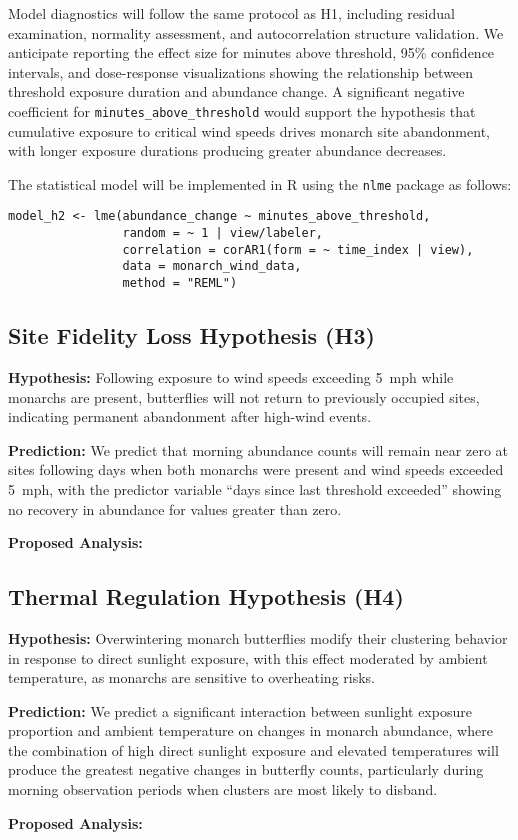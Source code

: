 Model diagnostics will follow the same protocol as H1, including residual examination, normality assessment, and autocorrelation structure validation. We anticipate reporting the effect size for minutes above threshold, 95\% confidence intervals, and dose-response visualizations showing the relationship between threshold exposure duration and abundance change. A significant negative coefficient for \texttt{minutes\_above\_threshold} would support the hypothesis that cumulative exposure to critical wind speeds drives monarch site abandonment, with longer exposure durations producing greater abundance decreases.

The statistical model will be implemented in R using the \texttt{nlme} package as follows:

\begin{verbatim}
model_h2 <- lme(abundance_change ~ minutes_above_threshold,
                random = ~ 1 | view/labeler,
                correlation = corAR1(form = ~ time_index | view),
                data = monarch_wind_data,
                method = "REML")
\end{verbatim}

\subsection{Site Fidelity Loss Hypothesis (H3)}

\textbf{Hypothesis:} Following exposure to wind speeds exceeding 5~mph while monarchs are present, butterflies will not return to previously occupied sites, indicating permanent abandonment after high-wind events.

\textbf{Prediction:} We predict that morning abundance counts will remain near zero at sites following days when both monarchs were present and wind speeds exceeded 5~mph, with the predictor variable ``days since last threshold exceeded'' showing no recovery in abundance for values greater than zero.

\textbf{Proposed Analysis:}

\subsection{Thermal Regulation Hypothesis (H4)}

\textbf{Hypothesis:} Overwintering monarch butterflies modify their clustering behavior in response to direct sunlight exposure, with this effect moderated by ambient temperature, as monarchs are sensitive to overheating risks.

\textbf{Prediction:} We predict a significant interaction between sunlight exposure proportion and ambient temperature on changes in monarch abundance, where the combination of high direct sunlight exposure and elevated temperatures will produce the greatest negative changes in butterfly counts, particularly during morning observation periods when clusters are most likely to disband.

\textbf{Proposed Analysis:}
